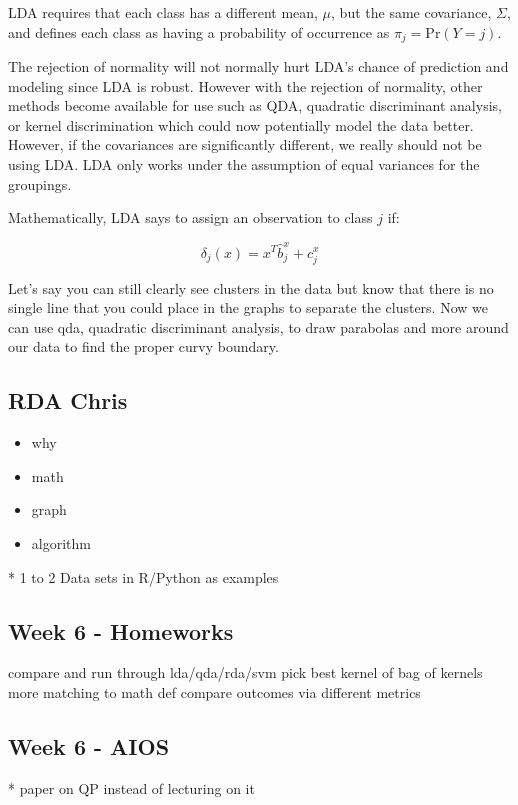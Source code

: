 \documentclass[a4paper]{article}
\begin{document}
LDA requires that each class has a different mean, $\mu$, but the same covariance, $\Sigma$, and defines each class as having a probability of occurrence as $\pi_{j}=\text{Pr}(Y=j)$.

The rejection of normality will not normally hurt LDA's chance of prediction and modeling since LDA is robust. However with the rejection of normality, other methods become available for use such as QDA, quadratic discriminant analysis, or kernel discrimination which could now potentially model the data better. However, if the covariances are significantly different, we really should not be using LDA. LDA only works under the assumption of equal variances for the groupings.


Mathematically, LDA says to assign an observation to class $j$ if:

$$\delta_{j}(x)=x^{T}\hat{b}^{x}_{j}+c^{x}_{j}$$

Let's say you can still clearly see clusters in the data but know that there is no single line that you could place in the graphs to separate the clusters. Now we can use qda, quadratic discriminant analysis, to draw parabolas and more around our data to find the proper curvy boundary. 

\subsection{RDA \textbf{Chris}}
\begin{itemize}
\item why
\item math
\item graph
\item algorithm
\end{itemize}

* 1 to 2 Data sets in R/Python as examples

\subsection{Week 6 - Homeworks}
compare and run through lda/qda/rda/svm
pick best kernel of bag of kernels
more matching to math def
compare outcomes via different metrics

\subsection{Week 6 - AIOS}


* paper on QP instead of lecturing on it
\end{document}

